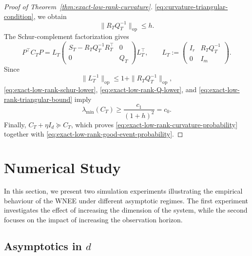 \documentclass[11pt]{article}
\begin{document}
\begin{proof}[Proof of Theorem~\ref{thm:exact-low-rank-curvature}]
\eqref{eq:curvature-triangular-condition}, we obtain
\begin{equation}
    \|R_TQ_T^{-1}\|_{\mathrm{op}}\leq h.
\label{eq:exact-low-rank-triangular-bound}
\end{equation}
The Schur-complement factorization gives
\[
    P^\top C_TP
    =L_T
    \begin{pmatrix}
        S_T-R_TQ_T^{-1}R_T^\top & 0\\
        0 & Q_T
    \end{pmatrix}
    L_T^\top,
    \qquad
    L_T:=
    \begin{pmatrix}
        I_r & R_TQ_T^{-1}\\
        0 & I_m
    \end{pmatrix}.
\]
Since
\[
    \|L_T^{-1}\|_{\mathrm{op}}
    \leq1+\|R_TQ_T^{-1}\|_{\mathrm{op}},
\]
\eqref{eq:exact-low-rank-schur-lower},
\eqref{eq:exact-low-rank-Q-lower}, and
\eqref{eq:exact-low-rank-triangular-bound} imply
\[
    \lambda_{\min}(C_T)
    \geq\frac{c_1}{(1+h)^2}=c_0.
\]
Finally, $C_T+\eta I_d\succeq C_T$, which proves
\eqref{eq:exact-low-rank-curvature-probability} together with
\eqref{eq:exact-low-rank-good-event-probability}.
\end{proof}



















\section{Numerical Study}
\label{sec:numerical-study}
In this section, we present two simulation experiments illustrating the empirical behaviour of the WNEE under different asymptotic regimes. The first experiment investigates the effect of increasing the dimension of the system, while the second focuses on the impact of increasing the observation horizon.
\subsection{Asymptotics in $d$}\label{subsec:Experiment_1}
\end{document}
